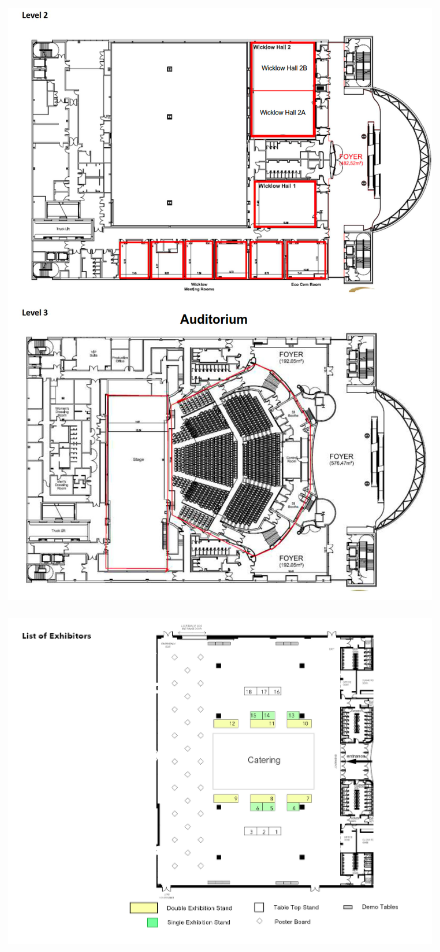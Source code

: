   \begin{figure}[h!]
  \centering
      \includegraphics[width=0.49\linewidth]{examples/handbook_coling25/venue_map/ACL 2022 - CCD Floorplan_2.png}
 \end{figure}

  \begin{figure}[h!]
  \centering
      \includegraphics[width=1\linewidth]{examples/handbook_coling25/venue_map/ACL 2022 Exhibtor Floorplan 05.05.png}
 \end{figure}
\clearpage
